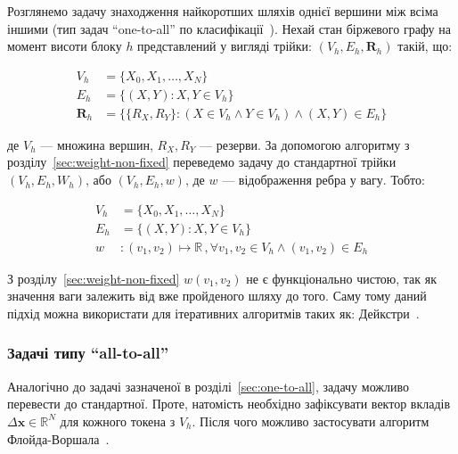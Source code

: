 \documentclass[../index.tex]{subfiles}
\begin{document}
Розглянемо задачу знаходження найкоротших шляхів однієї вершини між всіма іншими
(тип задач ``one-to-all'' по класифікації~\cite{deo1980shortest}). Нехай стан
біржевого графу на момент висоти блоку $h$ представлений у вигляді трійки:
$(V_{h}, E_{h}, \mathbf{R}_{h})$ такій, що:

\begin{equation}
  \begin{aligned}
    V_{h} &= \{ X_{0}, X_{1}, \ldots, X_{N}\} \\
    E_{h} &= \{(X, Y): X, Y \in V_{h}\}\\
    \mathbf{R}_{h} &= \{ \{R_{X}, R_{Y}\}: (X \in V_{h} \land Y \in V_{h}) \land (X, Y) \in E_{h} \}
  \end{aligned}
\end{equation}

де $V_{h}$ --- множина вершин, $R_{X}, R_{Y}$ --- резерви. За допомогою алгоритму з
розділу~\ref{sec:weight-non-fixed} переведемо задачу до стандартної трійки
$(V_{h}, E_{h}, W_{h})$, або $(V_{h}, E_{h}, w)$, де $w$ --- відображення ребра у
вагу. Тобто:

\begin{equation}
  \begin{aligned}
    V_{h} &= \{ X_{0}, X_{1}, \ldots, X_{N}\} \\
    E_{h} &= \{(X, Y): X, Y \in V_{h}\}\\
    w &: (v_{1}, v_{2}) \mapsto \mathbb{R} \,, \forall v_{1}, v_{2} \in V_{h} \land (v_{1}, v_{2}) \in E_{h}
  \end{aligned}
\end{equation}

З розділу~\ref{sec:weight-non-fixed} $w(v_{1}, v_{2})$ не є функціонально чистою, так як
значення ваги залежить від вже пройденого шляху до того. Саму тому даний підхід
можна використати для ітеративних алгоритмів таких як: Дейкстри~\cite{dijkstra}.

\subsubsection{Задачі типу ``all-to-all''}

Аналогічно до задачі зазначеної в розділі~\ref{sec:one-to-all}, задачу можливо
перевести до стандартної. Проте, натомість необхідно зафіксувати вектор вкладів
$\Delta \mathbf{x} \in \mathbb{R}^{N}$ для кожного токена з $V_{h}$. Після чого можливо
застосувати алгоритм Флойда-Воршала~\cite{floyd_warshall_alg}.
\end{document}

